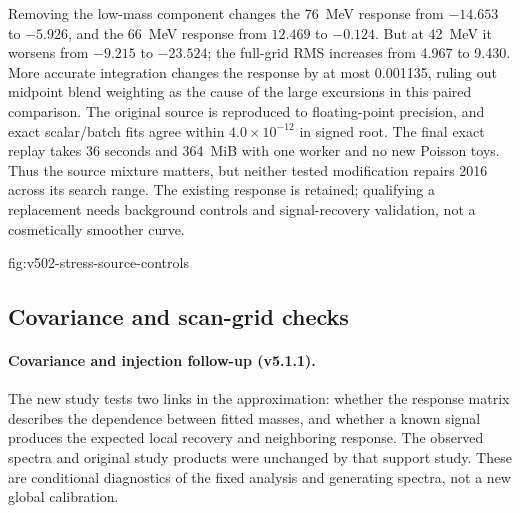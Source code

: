 Removing the low-mass component changes the 76~MeV response from
$-14.653$ to $-5.926$, and the 66~MeV response from $12.469$ to $-0.124$.
But at 42~MeV it worsens from $-9.215$ to $-23.524$; the full-grid RMS
increases from 4.967 to 9.430. More accurate integration changes the
response by at most 0.001135, ruling out midpoint blend weighting as the
cause of the large excursions in this paired comparison. The original
source is reproduced to floating-point precision, and exact scalar/batch
fits agree within $4.0\times10^{-12}$ in signed root. The final exact
replay takes 36 seconds and 364~MiB with one worker and no new Poisson
toys. Thus the source mixture matters, but neither tested modification
repairs 2016 across its search range. The existing response is retained;
qualifying a replacement needs background controls and signal-recovery
validation, not a cosmetically smoother curve.

{fig:v502-stress-source-controls}
\FloatBarrier

\subsection{Covariance and scan-grid checks}

\paragraph{Covariance and injection follow-up (v5.1.1).}
The new study tests two links in the approximation: whether the response
matrix describes the dependence between fitted masses, and whether a known
signal produces the expected local recovery and neighboring response.
The observed spectra and original study products were unchanged by that support study.
These are conditional diagnostics of the fixed analysis and generating
spectra, not a new global calibration.

